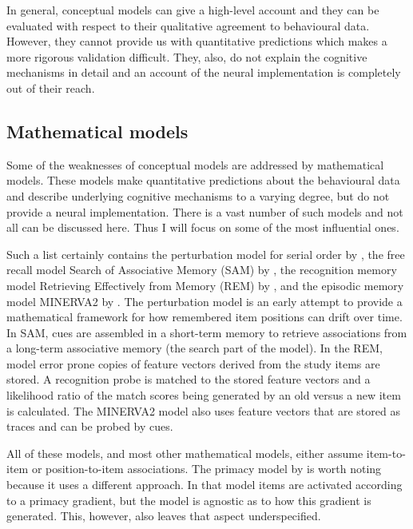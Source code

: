 In general, conceptual models can give a high-level account and they can be evaluated with respect to their qualitative agreement to behavioural data.
However, they cannot provide us with quantitative predictions which makes a more rigorous validation difficult.
They, also, do not explain the cognitive mechanisms in detail and an account of the neural implementation is completely out of their reach.


\subsection{Mathematical models}
Some of the weaknesses of conceptual models are addressed by mathematical models.
These models make quantitative predictions about the behavioural data and describe underlying cognitive mechanisms to a varying degree, but do not provide a neural implementation.
There is a vast number of such models and not all can be discussed here.
Thus I will focus on some of the most influential ones.

Such a list certainly contains the perturbation model for serial order by \textcite{Estes1972}, the free recall model Search of Associative Memory (SAM) by \textcite{Raaijmakers1981}, the recognition memory model Retrieving Effectively from Memory (REM) by \textcite{Shiffrin1997}, and the episodic memory model MINERVA2 by \textcite{Hintzman1988}.
The perturbation model is an early attempt to provide a mathematical framework for how remembered item positions can drift over time.
In SAM, cues are assembled in a short-term memory to retrieve associations from a long-term associative memory (the search part of the model).
In the REM, model error prone copies of feature vectors derived from the study items are stored.
A recognition probe is matched to the stored feature vectors and a likelihood ratio of the match scores being generated by an old versus a new item is calculated.
The MINERVA2 model also uses feature vectors that are stored as traces and can be probed by cues.

All of these models, and most other mathematical models, either assume item-to-item or position-to-item associations.
The primacy model by \textcite{Page1998} is worth noting because it uses a different approach.
In that model items are activated according to a primacy gradient, but the model is agnostic as to how this gradient is generated.
This, however, also leaves that aspect underspecified.

